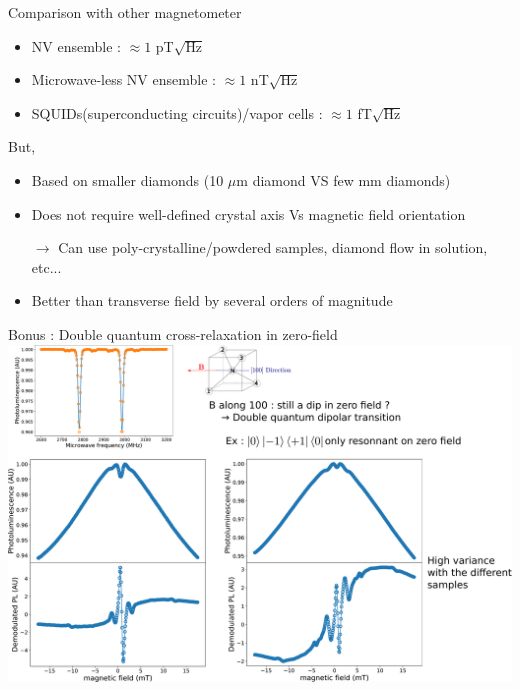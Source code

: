 \documentclass{beamer}
\begin{document}
\begin{frame}{Comparison with other magnetometer}
\begin{itemize}
\item NV ensemble : $\approx 1$ pT$\sqrt{\textrm{Hz}}$
\item Microwave-less NV ensemble : $\approx 1$ nT$\sqrt{\textrm{Hz}}$
\item SQUIDs(superconducting circuits)/vapor cells : $\approx 1$ fT$\sqrt{\textrm{Hz}}$
\end{itemize}
\bigskip

But,

\begin{itemize}
\item Based on smaller diamonds (10 $\mu$m diamond VS few mm diamonds)
\item Does not require well-defined crystal axis Vs magnetic field orientation

$\to$ Can use poly-crystalline/powdered samples, diamond flow in solution, etc...

\item Better than transverse field by several orders of magnitude
\end{itemize}

\end{frame}
\begin{frame}{Bonus : Double quantum cross-relaxation in zero-field}
\centering
\includegraphics[scale=.22]{slide_DQ}
\end{frame}
\end{document}

